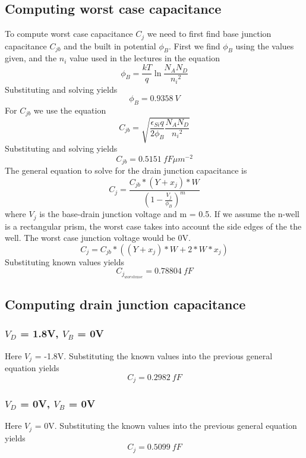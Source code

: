 \documentclass[12pt]{article}
\begin{document}
\subsection{Computing worst case capacitance}
To compute worst case capacitance $C_j$ we need to first find base junction capacitance $C_{jb}$ and the built in potential
$\phi _B$. First we find $\phi _B$ using the values given, and the $n_i$ value used in the lectures in the equation
\[\phi_B = \frac{kT}{q}\ln{\frac{N_A N_D}{{n_i}^2}} \]
Substituting and solving yields
\[\phi_B = \SI{0.9358}{V}\]
For $C_{jb}$ we use the equation
\[C_{jb} = \sqrt{ \frac{\epsilon_{Si}q}{2\phi_B} \frac{N_A N_D}{{n_i}^2}    }\]
Substituting and solving yields
\[C_{jb} = \SI{0.5151}{fF \mu m^{-2}} \]
The general equation to solve for the drain junction capacitance is 
\[C_j = \frac{C_{jb} * (Y + x_j) * W}{ (1 - \frac{V_j}{\phi_B})^m      } \]
where $V_j$ is the base-drain junction voltage and m = 0.5. If we assume the n-well is a rectangular prism, 
the worst case takes into account the side edges of the the well. The worst case junction voltage would be 0V.
\[C_j = C_{jb} * ((Y + x_j) * W + 2 * W * x_j) \]
Substituting known values yields
\[C_{j_{worstcase}} = \SI{0.78804}{fF}\]
\subsection{Computing drain junction capacitance}
\subsubsection{$V_D$ = 1.8V, $V_B$ = 0V}
Here $V_j$ = -1.8V. Substituting the known values into the previous general equation yields
\[C_j = \SI{0.2982}{fF}\]
\subsubsection{$V_D$ = 0V, $V_B$ = 0V}
Here $V_j$ = 0V. Substituting the known values into the previous general equation yields
\[C_j = \SI{0.5099}{fF}\]
\pagebreak
\end{document}

